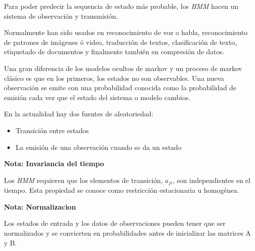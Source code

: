 Para poder predecir la sequencia de estado más probable, los \emph{HMM} hacen un sistema de observación y transmisión.








Normalmente han sido usados en reconocimiento de voz o habla, reconocimiento de patrones de imágenes ó video, traducción de textos, clasificación de texto, etiquetado de documentos y finalmente también en compresión de datos.

Una gran diferencia de los modelos ocultos de markov y un proceso de markov clásico es que en los primeros, los estados no son observables.  Una nueva observación se emite con una probabilidad conocida como la probabilidad de emisión cada vez que el estado del sistema o modelo cambios.

En la actualidad hay dos fuentes de aleatoriedad:

\begin{itemize}
	\item Transición entre estados
	\item La emisión de una observación cuando se da un estado
\end{itemize}




\textbf{Nota: Invariancia del tiempo}

Los \textit{HMM} requieren que los elementos de transición, $a_{ji}$, son independientes en el tiempo. Esta propiedad se conoce como restricción estacionaria u homogénea.

\textbf{Nota: Normalizacion}

Los estados de entrada y los datos de observaciones pueden tener que ser normalizados y se convierten en probabilidades antes de inicializar las matrices A y B.

